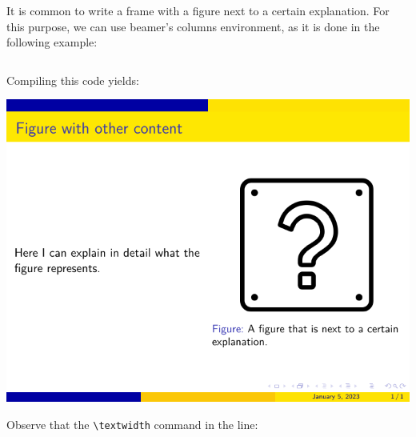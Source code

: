 It is common to write a frame with a figure next to a certain explanation. For this purpose, we can use beamer’s columns environment, as it is done in the following example:

\inputminted[linenos=true]{latex}{examples/beamer/beamerfigure04.tex}

Compiling this code yields:

\includegraphics{examples/beamer/beamerfigure04.pdf}

Observe that the \verb|\textwidth| command in the line:

